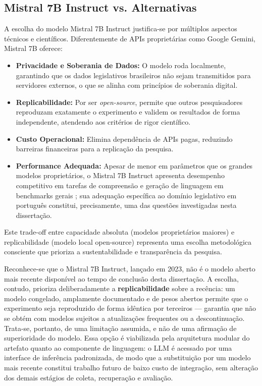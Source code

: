 \subsection{Mistral 7B Instruct vs. Alternativas}
\label{subsec:escolha_modelo}

A escolha do modelo Mistral 7B Instruct justifica-se por múltiplos aspectos técnicos e científicos. Diferentemente de APIs proprietárias como Google Gemini, Mistral 7B oferece:

\begin{itemize}
\item \textbf{Privacidade e Soberania de Dados:} O modelo roda localmente, garantindo que os dados legislativos brasileiros não sejam transmitidos para servidores externos, o que se alinha com princípios de soberania digital.
\item \textbf{Replicabilidade:} Por ser \textit{open-source}, permite que outros pesquisadores reproduzam exatamente o experimento e validem os resultados de forma independente, atendendo aos critérios de rigor científico.
\item \textbf{Custo Operacional:} Elimina dependência de APIs pagas, reduzindo barreiras financeiras para a replicação da pesquisa.
\item \textbf{Performance Adequada:} Apesar de menor em parâmetros que os grandes modelos proprietários, o Mistral 7B Instruct apresenta desempenho competitivo em tarefas de compreensão e geração de linguagem em benchmarks gerais \cite{Jiang2023}; sua adequação específica ao domínio legislativo em português constitui, precisamente, uma das questões investigadas nesta dissertação.
\end{itemize}

Este trade-off entre capacidade absoluta (modelos proprietários maiores) e replicabilidade (modelo local open-source) representa uma escolha metodológica consciente que prioriza a sustentabilidade e transparência da pesquisa.

Reconhece-se que o Mistral 7B Instruct, lançado em 2023, não é o modelo aberto mais recente disponível ao tempo de conclusão desta dissertação. A escolha, contudo, prioriza deliberadamente a \textbf{replicabilidade} sobre a recência: um modelo congelado, amplamente documentado e de pesos abertos permite que o experimento seja reproduzido de forma idêntica por terceiros --- garantia que não se obtém com modelos sujeitos a atualizações frequentes ou a descontinuação. Trata-se, portanto, de uma limitação assumida, e não de uma afirmação de superioridade do modelo. Essa opção é viabilizada pela arquitetura modular do artefato quanto ao componente de linguagem: o LLM é acessado por uma interface de inferência padronizada, de modo que a substituição por um modelo mais recente constitui trabalho futuro de baixo custo de integração, sem alteração dos demais estágios de coleta, recuperação e avaliação.

